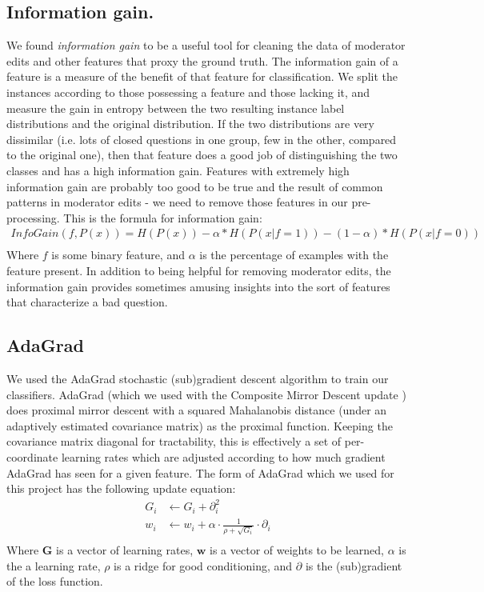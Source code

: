 \documentclass[11pt]{article}
\begin{document}
\subsection*{Information gain.}We found \emph{information gain} \cite{wiki:infogain} to be a useful tool for cleaning the data of moderator edits and other features that proxy the ground truth. The information gain of a feature is a measure of the benefit of that feature for classification. We split the instances according to those possessing a feature and those lacking it, and measure the gain in entropy between the two resulting instance label distributions and the original distribution. If the two distributions are very dissimilar (i.e. lots of closed questions in one group, few in the other, compared to the original one), then that feature does a good job of distinguishing the two classes and has a high information gain. Features with extremely high information gain are probably too good to be true and the result of common patterns in moderator edits - we need to remove those features in our pre-processing. This is the formula for information gain:
\begin{equation*}
\begin{split}
InfoGain(f, P(x)) = H(P(x)) - \alpha*H(P(x|f=1)) - (1 - \alpha)*H(P(x|f=0))\\
\end{split}
\end{equation*}
Where $f$ is some binary feature, and $\alpha$ is the percentage of examples with the feature present. In addition to being helpful for removing moderator edits, the information gain provides sometimes amusing insights into the sort of features that characterize a bad question.

\subsection*{AdaGrad}We used the AdaGrad \cite{duchi:11a} stochastic (sub)gradient descent algorithm to train our classifiers. AdaGrad (which we used with the Composite Mirror Descent update \cite{duchi:10a}) does proximal mirror descent with a squared Mahalanobis distance (under an adaptively estimated covariance matrix) as the proximal function. Keeping the covariance matrix diagonal for tractability, this is effectively a set of per-coordinate learning rates which are adjusted according to how much gradient AdaGrad has seen for a given feature. The form of AdaGrad which we used for this project has the following update equation:
\begin{equation*}
\begin{split}
G_i &\leftarrow G_i + \partial_i^2\\
w_i &\leftarrow w_i + \alpha \cdot \frac{1}{\rho + \sqrt{G_i}} \cdot \partial_i\\
\end{split}
\end{equation*}
Where $\textbf{G}$ is a vector of learning rates, $\textbf{w}$ is a vector of weights to be learned, $\alpha$ is the a learning rate, $\rho$ is a ridge for good conditioning, and $\partial$ is the (sub)gradient of the loss function.
\end{document}
